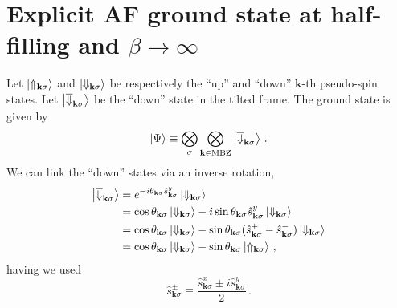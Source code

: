 \section{Explicit AF ground state at half-filling and $\beta \to \infty$}\label{appsubsec:af-T=0-gs}

Let $\ket{\Uparrow_{\mathbf{k}\sigma}}$ and $\ket{\Downarrow_{\mathbf{k}\sigma}}$ be respectively the ``up'' and ``down'' $\mathbf{k}$-th pseudo-spin states. Let $\ket{\overline{\Downarrow}_{\mathbf{k}\sigma}}$ be the ``down'' state in the tilted frame. The ground state is given by
\begin{equation}\label{appeq:af-hm-gs-1}
	\ket{\Psi} \equiv \bigotimes_\sigma \bigotimes_{\mathbf{k}\in\mathrm{MBZ}} \ket{\overline{\Downarrow}_{\mathbf{k}\sigma}} \, .
\end{equation}
We can link the ``down'' states via an inverse rotation,
\begin{align}
	\ket{\overline{\Downarrow}_{\mathbf{k}\sigma}} &= e^{-i\theta_{\mathbf{k}\sigma} \hat s_{\mathbf{k}\sigma}^y} \ket{\Downarrow_{\mathbf{k}\sigma}} \nonumber \\
	&= \cos \theta_{\mathbf{k}\sigma} \ket{\Downarrow_{\mathbf{k}\sigma}} - i \sin\theta_{\mathbf{k}\sigma} \hat s_{\mathbf{k}\sigma}^y \ket{\Downarrow_{\mathbf{k}\sigma}} \nonumber \\
	&= \cos \theta_{\mathbf{k}\sigma} \ket{\Downarrow_{\mathbf{k}\sigma}} - \sin\theta_{\mathbf{k}\sigma} (\hat s_{\mathbf{k}\sigma}^+ - \hat s_{\mathbf{k}\sigma}^-) \ket{\Downarrow_{\mathbf{k}\sigma}} \nonumber \\
	&= \cos \theta_{\mathbf{k}\sigma} \ket{\Downarrow_{\mathbf{k}\sigma}} - \sin\theta_{\mathbf{k}\sigma} \ket{\Uparrow_{\mathbf{k}\sigma}} \, , \label{appeq:af-hm-tilted-down}
\end{align}
having we used
\[
	\hat s_{\mathbf{k}\sigma}^\pm \equiv \frac{\hat s_{\mathbf{k}\sigma}^x \pm i\hat s_{\mathbf{k}\sigma}^y}{2} \, .
\]

